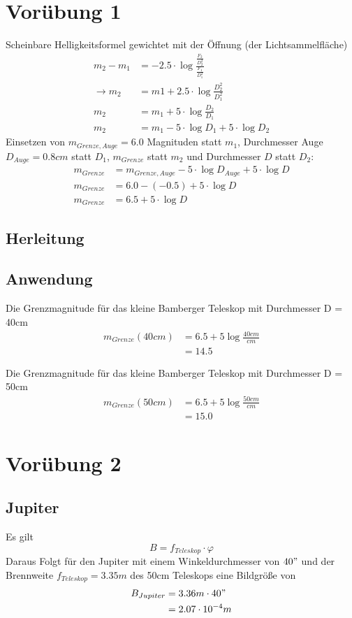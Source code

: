 \documentclass[titlepage]{scrartcl}
\begin{document}
\section{Vorübung 1}
Scheinbare Helligkeitsformel gewichtet mit der Öffnung (der Lichtsammelfläche)
\begin{align*}
m_2-m_1&=-2.5 \cdot\log \frac{\frac{F_2}{D_2^2}}{\frac{F_1}{D_1^2}}\\
\rightarrow m_2&=m1+2.5\cdot\log\frac{D_2^2}{D_1^2}\\
m_2&=m_1+5\cdot \log \frac{D_2}{D_1}\\
m_2&=m_1-5\cdot\log D_1 +5\cdot\log D_2
\end{align*}
Einsetzen von $m_{Grenze,Auge}=6.0$ Magnituden statt $m_1$, Durchmesser Auge $D_{Auge} = 0.8cm$ statt $D_1$, $m_{Grenze}$ statt $m_2$ und Durchmesser $D$ statt $D_2$:
\begin{align*}
m_{Grenze}&=m_{Grenze, Auge}-5\cdot\log D_{Auge} +5\cdot\log D\\
m_{Grenze}&=6.0-(-0.5) +5\cdot\log D\\
m_{Grenze}&=6.5 + 5\cdot \log D
\end{align*}
\subsection{Herleitung}
\subsection{Anwendung}
Die Grenzmagnitude für das kleine Bamberger Teleskop mit Durchmesser D = 40cm
\begin{align*}
m_{Grenze} (40cm)&= 6.5 + 5 \log \frac{40cm}{cm}\\
&= 14.5
\end{align*}

Die Grenzmagnitude für das kleine Bamberger Teleskop mit Durchmesser D = 50cm
\begin{align*}
m_{Grenze} (50cm)&= 6.5 + 5 \log \frac{50cm}{cm}\\
&= 15.0
\end{align*}
\section{Vorübung 2}
\subsection{Jupiter}
Es gilt
\begin{equation*}
B = f_{Teleskop}\cdot \varphi
\end{equation*}
Daraus Folgt für den Jupiter mit einem Winkeldurchmesser von $40"$ und der Brennweite $f_{Teleskop}=3.35m$ des 50cm Teleskops eine Bildgröße von
\begin{align*}
B_{Jupiter}&=3.36m \cdot 40"\\
&= 2.07 \cdot 10^{-4} m
\end{align*}
\end{document}
